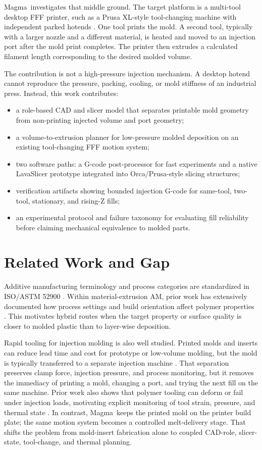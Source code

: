 \documentclass[conference]{IEEEtran}
\newcommand{\magma}{Magma}
\begin{document}
\magma\ investigates that middle ground. The target platform is a multi-tool desktop FFF printer, such as a Prusa XL-style tool-changing machine with independent parked hotends \cite{prusaXL}. One tool prints the mold. A second tool, typically with a larger nozzle and a different material, is heated and moved to an injection port after the mold print completes. The printer then extrudes a calculated filament length corresponding to the desired molded volume.

The contribution is not a high-pressure injection mechanism. A desktop hotend cannot reproduce the pressure, packing, cooling, or mold stiffness of an industrial press. Instead, this work contributes:
\begin{itemize}
\item a role-based CAD and slicer model that separates printable mold geometry from non-printing injected volume and port geometry;
\item a volume-to-extrusion planner for low-pressure molded deposition on an existing tool-changing FFF motion system;
\item two software paths: a G-code post-processor for fast experiments and a native LavaSlicer prototype integrated into Orca/Prusa-style slicing structures;
\item verification artifacts showing bounded injection G-code for same-tool, two-tool, stationary, and rising-Z fills;
\item an experimental protocol and failure taxonomy for evaluating fill reliability before claiming mechanical equivalence to molded parts.
\end{itemize}

\section{Related Work and Gap}
Additive manufacturing terminology and process categories are standardized in ISO/ASTM 52900 \cite{iso52900}. Within material-extrusion AM, prior work has extensively documented how process settings and build orientation affect polymer properties \cite{dizonMechanical}. This motivates hybrid routes when the target property or surface quality is closer to molded plastic than to layer-wise deposition.

Rapid tooling for injection molding is also well studied. Printed molds and inserts can reduce lead time and cost for prototype or low-volume molding, but the mold is typically transferred to a separate injection machine \cite{dizonMolds,dizonTechnologies,gohnMoldInserts,simpsonAMTool}. That separation preserves clamp force, injection pressure, and process monitoring, but it removes the immediacy of printing a mold, changing a port, and trying the next fill on the same machine. Prior work also shows that polymer tooling can deform or fail under injection loads, motivating explicit monitoring of tool strain, pressure, and thermal state \cite{gohnMoldInserts,krizsmaMonitoring}. In contrast, \magma\ keeps the printed mold on the printer build plate; the same motion system becomes a controlled melt-delivery stage. That shifts the problem from mold-insert fabrication alone to coupled CAD-role, slicer-state, tool-change, and thermal planning.
\end{document}
